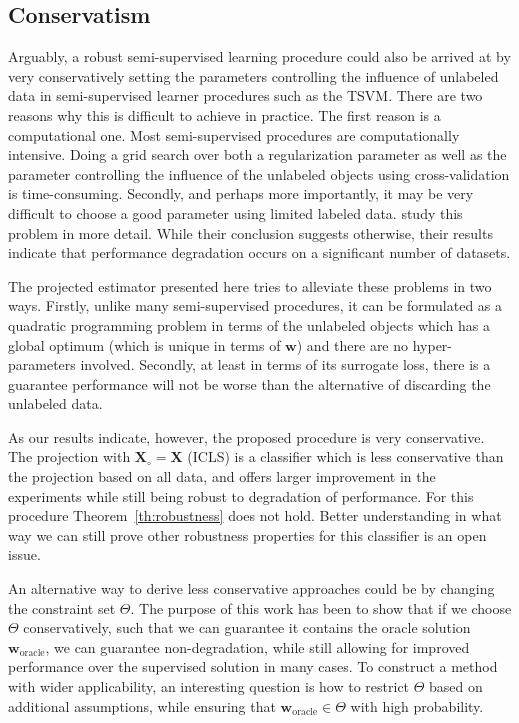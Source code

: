 \documentclass[sts,preprint]{imsart-custom}
\renewcommand{\vec}[1]{\mathbf{#1}}
\begin{document}
\subsection{Conservatism}
Arguably, a robust semi-supervised learning procedure could also be arrived at by very conservatively setting the parameters controlling the influence of unlabeled data in semi-supervised learner procedures such as the TSVM. There are two reasons why this is difficult to achieve in practice. The first reason is a computational one. Most semi-supervised procedures are computationally intensive. Doing a grid search over both a regularization parameter as well as the parameter controlling the influence of the unlabeled objects using cross-validation is time-consuming. Secondly, and perhaps more importantly, it may be very difficult to choose a good parameter using limited labeled data. \citet{Goldberg2009} study this problem in more detail. While their conclusion suggests otherwise, their results indicate that performance degradation occurs on a significant number of datasets. 

The projected estimator presented here tries to alleviate these problems in two ways. Firstly, unlike many semi-supervised procedures, it can be formulated as a quadratic programming problem in terms of the unlabeled objects which has a global optimum (which is unique in terms of $\vec{w}$) and there are no hyper-parameters involved. Secondly, at least in terms of its surrogate loss, there is a guarantee performance will not be worse than the alternative of discarding the unlabeled data. 

As our results indicate, however, the proposed procedure is very conservative. The projection with $\mathbf{X}_\circ = \mathbf{X}$ (ICLS) is a classifier which is less conservative than the projection based on all data, and offers larger improvement in the experiments while still being robust to degradation of performance. For this procedure Theorem~\ref{th:robustness} does not hold.  Better understanding in what way we can still prove other robustness properties for this classifier is an open issue.

An alternative way to derive less conservative approaches could be by changing the constraint set $\Theta$. The purpose of this work has been to show that if we choose $\Theta$ conservatively, such that we can guarantee it contains the oracle solution $\vec{w}_\text{oracle}$, we can guarantee non-degradation, while still allowing for improved performance over the supervised solution in many cases. To construct a method with wider applicability, an interesting question is how to restrict $\Theta$ based on additional assumptions, while ensuring that $\vec{w}_\text{oracle} \in \Theta$ with high probability.
\end{document}
